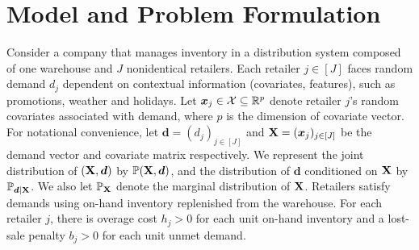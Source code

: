 \documentclass[mnsc, nonblindrev]{informswp}
\newcommand{\1}[1]{\mathds{1}{\left(#1\right)}}
\begin{document}
\section{Model and Problem Formulation}
Consider a company that manages inventory in a distribution system composed of one warehouse and $J$ nonidentical retailers. Each retailer $j \in [J]$ faces random demand ${d}_j$ dependent on contextual information (covariates, features), such as promotions, weather and holidays. Let ${\bm x}_j \in \mathcal{X} \subseteq \mathbb{R}^p$ denote retailer $j$'s random covariates associated with demand, where $p$ is the dimension of covariate vector. For notational convenience, let ${\bm d} = ({d}_j)_{j \in [J]}$ and ${{\mathbf{X}}} = ({\bm x}_j)_{j \in [J]}$ be the demand vector and covariate matrix respectively. We represent the joint distribution of $( {{\mathbf{X}}}, {\bm d})$ by $\mathbb{P}{({\mathbf{X}}, \bm d)}$, and the distribution of $\bm d$ conditioned on ${\mathbf{X}}$ by $\mathbb{P}_{\bm d \mid {\mathbf{X}}}$. We also let $\mathbb{P}_{{\mathbf{X}}}$ denote the marginal distribution of ${\mathbf{X}}$. Retailers satisfy demands using on-hand inventory replenished from the warehouse. For each retailer $j$, there is overage cost $h_j>0$ for each unit on-hand inventory and a lost-sale penalty $b_j>0$ for each unit unmet demand.
\end{document}
